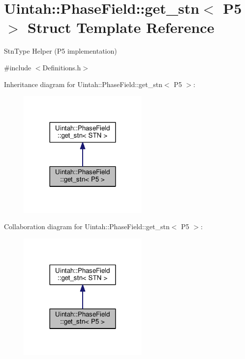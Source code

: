 \hypertarget{structUintah_1_1PhaseField_1_1get__stn_3_01P5_01_4}{}\section{Uintah\+:\+:Phase\+Field\+:\+:get\+\_\+stn$<$ P5 $>$ Struct Template Reference}
\label{structUintah_1_1PhaseField_1_1get__stn_3_01P5_01_4}


Stn\+Type Helper (P5 implementation)  




{\ttfamily \#include $<$Definitions.\+h$>$}



Inheritance diagram for Uintah\+:\+:Phase\+Field\+:\+:get\+\_\+stn$<$ P5 $>$\+:\nopagebreak
\begin{figure}[H]
\begin{center}
\leavevmode
\includegraphics[width=180pt]{structUintah_1_1PhaseField_1_1get__stn_3_01P5_01_4__inherit__graph}
\end{center}
\end{figure}


Collaboration diagram for Uintah\+:\+:Phase\+Field\+:\+:get\+\_\+stn$<$ P5 $>$\+:\nopagebreak
\begin{figure}[H]
\begin{center}
\leavevmode
\includegraphics[width=180pt]{structUintah_1_1PhaseField_1_1get__stn_3_01P5_01_4__coll__graph}
\end{center}
\end{figure}
